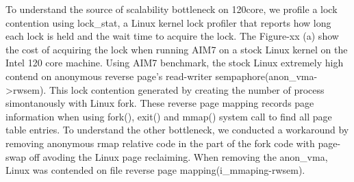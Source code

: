 To understand the source of scalability bottleneck on 120core, we profile a lock
contention using lock\_stat, a Linux kernel lock profiler that reports how long
each lock is held and the wait time to acquire the lock.
The Figure-xx (a) show the cost of acquiring the lock when running AIM7 on a
stock Linux kernel on the Intel 120 core machine.
Using AIM7 benchmark, the stock Linux extremely high contend on anonymous
reverse page's read-writer sempaphore(anon\_vma->rwsem).
This lock contention generated by creating the number of process simontanously
with Linux fork.
These reverse page mapping records page information when using fork(),
exit() and mmap() system call to find all page table entries.
To understand the other bottleneck, we conducted a workaround by removing
anonymous rmap relative code in the part of the fork code with page-swap off
avoding the Linux page reclaiming.
When removing the anon\_vma, Linux was contended on file reverse page
mapping(i\_mmaping-rwsem).


\fi


